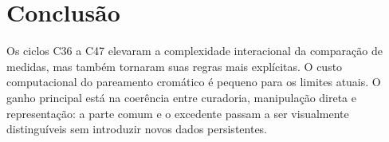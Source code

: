 \documentclass[12pt,a4paper]{article}
\begin{document}
\section{Conclusão}

Os ciclos C36 a C47 elevaram a complexidade interacional da comparação de medidas, mas também tornaram suas regras mais explícitas. O custo computacional do pareamento cromático é pequeno para os limites atuais. O ganho principal está na coerência entre curadoria, manipulação direta e representação: a parte comum e o excedente passam a ser visualmente distinguíveis sem introduzir novos dados persistentes.
\end{document}
